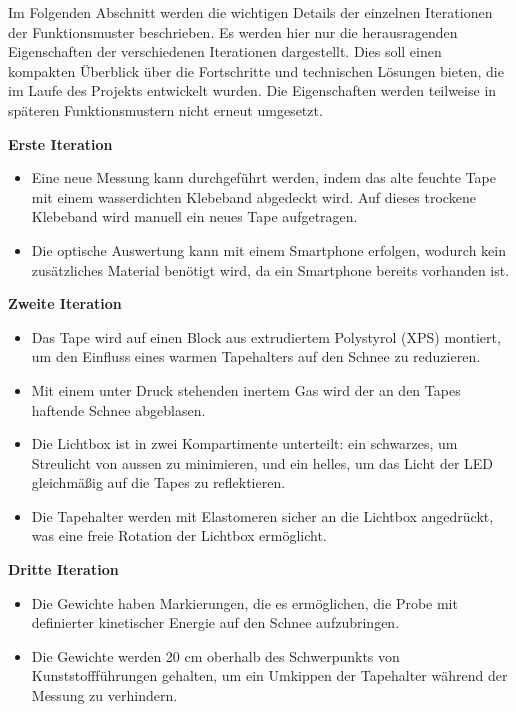 Im Folgenden Abschnitt werden die wichtigen Details der einzelnen Iterationen der Funktionsmuster beschrieben. Es werden hier nur die herausragenden Eigenschaften der verschiedenen Iterationen dargestellt. Dies soll einen kompakten Überblick über die Fortschritte und technischen Lösungen bieten, die im Laufe des Projekts entwickelt wurden. Die Eigenschaften werden teilweise in späteren Funktionsmustern nicht erneut umgesetzt.


\textbf{Erste Iteration}

\begin{itemize}
    \item Eine neue Messung kann durchgeführt werden, indem das alte feuchte Tape mit einem wasserdichten Klebeband abgedeckt wird. Auf dieses trockene Klebeband wird manuell ein neues Tape aufgetragen.
    \item Die optische Auswertung kann mit einem Smartphone erfolgen, wodurch kein zusätzliches Material benötigt wird, da ein Smartphone bereits vorhanden ist.
\end{itemize}

\textbf{Zweite Iteration}

\begin{itemize}
    
    \item Das Tape wird auf einen Block aus extrudiertem Polystyrol (XPS) montiert, um den Einfluss eines warmen Tapehalters auf den Schnee zu reduzieren.
    \item Mit einem unter Druck stehenden inertem Gas wird der an den Tapes haftende Schnee abgeblasen.
    \item Die Lichtbox ist in zwei Kompartimente unterteilt: ein schwarzes, um Streulicht von aussen zu minimieren, und ein helles, um das Licht der LED gleichmäßig auf die Tapes zu reflektieren.
    \item Die Tapehalter werden mit Elastomeren sicher an die Lichtbox angedrückt, was eine freie Rotation der Lichtbox ermöglicht.

\end{itemize}

\textbf{Dritte Iteration}

\begin{itemize}
    \item Die Gewichte haben Markierungen, die es ermöglichen, die Probe mit definierter kinetischer Energie auf den Schnee aufzubringen.
    \item Die Gewichte werden 20 cm oberhalb des Schwerpunkts von Kunststoffführungen gehalten, um ein Umkippen der Tapehalter während der Messung zu verhindern.
\end{itemize}

